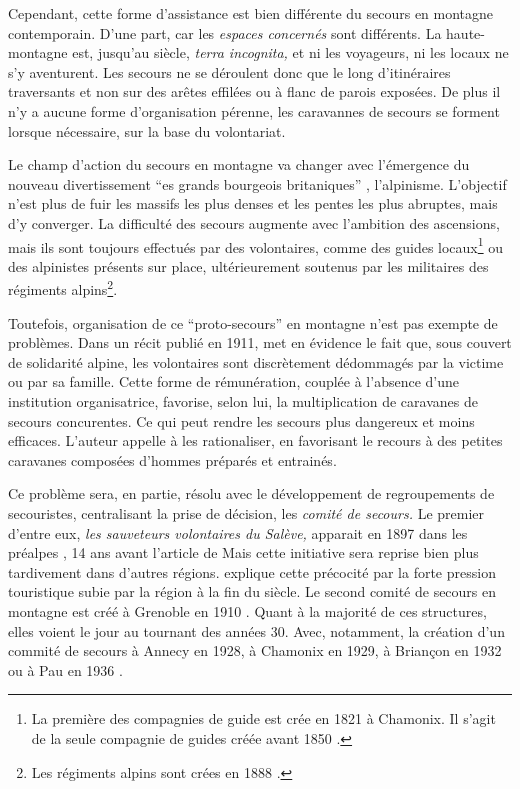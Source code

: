 Cependant, cette forme d'assistance est bien différente du secours en
montagne contemporain. D'une part, car les \emph{espaces concernés}
sont différents. La haute-montagne est, jusqu'au 
siècle, \emph{terra incognita,} et ni les voyageurs, ni les locaux ne
s'y aventurent. Les secours ne se déroulent donc que le long
d'itinéraires traversants et non sur des arêtes effilées ou à flanc de
parois exposées. De plus il n'y a aucune forme d'organisation pérenne,
les caravannes de secours se forment lorsque nécessaire, sur la base
du volontariat.

Le champ d'action du secours en montagne va changer avec l’émergence
du nouveau divertissement \enquote{es grands bourgeois
  britaniques} \autocite{Descamps2018}, l'alpinisme. L'objectif n'est
plus de fuir les massifs les plus denses et les pentes les plus
abruptes, mais d'y converger.  La difficulté des secours augmente avec
l'ambition des ascensions, mais ils sont toujours effectués par des
volontaires, comme des guides locaux\footnote{La première des
  compagnies de guide est crée en 1821 à Chamonix. Il s'agit de la
  seule compagnie de guides créée avant 1850
  \autocite{ContributeursWikipedia2020b}.} ou des alpinistes présents
sur place, ultérieurement soutenus par les militaires des régiments
alpins\footnote{Les régiments alpins sont crées en 1888
  \autocite{Mezin2016}.}.

Toutefois, organisation de ce \enquote{proto-secours} en montagne
n'est pas exempte de problèmes. Dans un récit publié en 1911,
 \autocite{Thomas1911} met en évidence le fait que, sous
couvert de solidarité alpine, les volontaires sont discrètement
dédommagés par la victime ou par sa famille. Cette forme de
rémunération, couplée à l'absence d'une institution organisatrice,
favorise, selon lui, la multiplication de caravanes de secours
concurentes. Ce qui peut rendre les secours plus dangereux et moins
efficaces. L'auteur appelle à les rationaliser, en favorisant le
recours à des petites caravanes composées d'hommes préparés et
entrainés.

Ce problème sera, en partie, résolu avec le développement de
regroupements de secouristes, centralisant la prise de décision, les
\emph{comité de secours.} Le premier d'entre eux, \emph{les sauveteurs
  volontaires du Salève,} apparait en 1897 dans les préalpes
\autocite{CFDLD}, 14 ans avant l'article de  Mais cette
initiative sera reprise bien plus tardivement dans d'autres
régions. \textcite{Caille2016} explique cette précocité par la forte
pression touristique subie par la région à la fin du 
siècle.  Le second comité de secours en montagne est créé à Grenoble
en 1910 \autocite{CFDLD,Caille2016}. Quant à la majorité de ces
structures, elles voient le jour au tournant des années 30. Avec,
notamment, la création d'un commité de secours à Annecy en 1928, à
Chamonix en 1929, à Briançon en 1932 ou à Pau en 1936 \autocite{CFDLD,
  Devies1946}.

